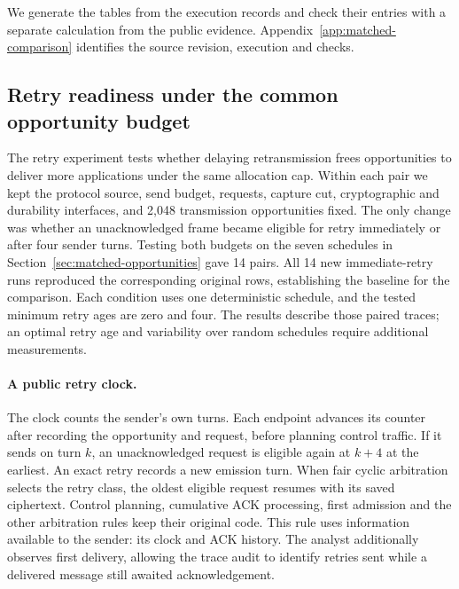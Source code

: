 \documentclass[pdflatex]{sn-jnl}
\theoremstyle{thmstyleone}
\theoremstyle{thmstylethree}
\theoremstyle{thmstyletwo}
\begin{document}
We generate the tables from the execution records and check their entries
with a separate calculation from the public evidence.
Appendix~\ref{app:matched-comparison} identifies the source revision,
execution and checks.

\subsection{Retry readiness under the common opportunity budget}
\label{sec:retry-readiness}

The retry experiment tests whether delaying retransmission frees
opportunities to deliver more applications under the same allocation cap.
Within each pair we kept the protocol source, send budget, requests,
capture cut, cryptographic and durability interfaces, and 2,048
transmission opportunities fixed. The only change was whether an
unacknowledged frame became eligible for retry immediately or after
four sender turns. Testing both budgets on the seven schedules in
Section~\ref{sec:matched-opportunities} gave 14 pairs. All 14 new
immediate-retry runs reproduced the corresponding original rows,
establishing the baseline for the comparison.
Each condition uses one deterministic schedule, and the tested minimum
retry ages are zero and four. The results describe those paired traces;
an optimal retry age and variability over random schedules require
additional measurements.

\paragraph{A public retry clock.}
The clock counts the sender's own turns. Each endpoint advances its
counter after recording the opportunity and request, before planning
control traffic. If it sends on turn $k$, an unacknowledged request is
eligible again at $k+4$ at the earliest. An exact retry records a new
emission turn. When fair cyclic arbitration selects the retry class,
the oldest eligible request resumes with its saved ciphertext. Control
planning, cumulative ACK processing, first admission and the other
arbitration rules keep their original code.
This rule uses information available to the sender: its clock and ACK
history. The analyst additionally observes first delivery, allowing the
trace audit to identify retries sent while a delivered message still
awaited acknowledgement.
\end{document}
